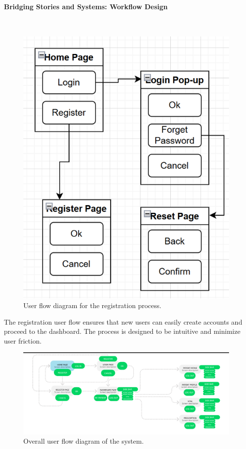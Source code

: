 \paragraph{Bridging Stories and Systems: Workflow Design}\mbox{}\\

\begin{figure}[H]
   \centering
   \includegraphics[width=0.8\linewidth]{../../images/userflow_registration.png}
   \caption{User flow diagram for the registration process.}
   \label{fig:userflow-registration}
\end{figure}

The registration user flow ensures that new users can easily create accounts and proceed to the dashboard. The process is designed to be intuitive and minimize user friction.

\begin{figure}[H]
   \centering
   \includegraphics[width=0.8\linewidth]{../../images/userflow_whole.png}
   \caption{Overall user flow diagram of the system.}
   \label{fig:userflow-whole}
\end{figure}

